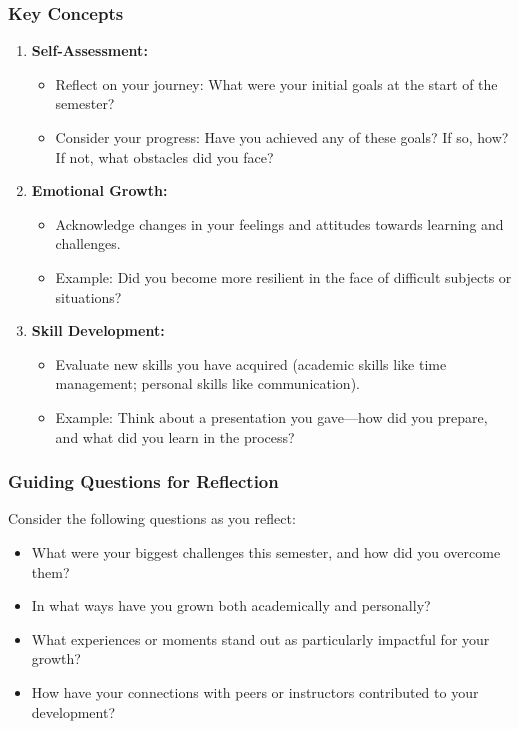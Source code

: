\documentclass[aspectratio=169]{beamer}
\begin{document}
\begin{frame}[fragile]
    \frametitle{Key Concepts}
    \begin{enumerate}
        \item \textbf{Self-Assessment:}
            \begin{itemize}
                \item Reflect on your journey: What were your initial goals at the start of the semester?
                \item Consider your progress: Have you achieved any of these goals? If so, how? If not, what obstacles did you face?
            \end{itemize}
      
        \item \textbf{Emotional Growth:}
            \begin{itemize}
                \item Acknowledge changes in your feelings and attitudes towards learning and challenges.
                \item Example: Did you become more resilient in the face of difficult subjects or situations?
            \end{itemize}

        \item \textbf{Skill Development:}
            \begin{itemize}
                \item Evaluate new skills you have acquired (academic skills like time management; personal skills like communication).
                \item Example: Think about a presentation you gave—how did you prepare, and what did you learn in the process?
            \end{itemize}
    \end{enumerate}
\end{frame}

\begin{frame}[fragile]
    \frametitle{Guiding Questions for Reflection}
    Consider the following questions as you reflect:
    \begin{itemize}
        \item What were your biggest challenges this semester, and how did you overcome them?
        \item In what ways have you grown both academically and personally?
        \item What experiences or moments stand out as particularly impactful for your growth?
        \item How have your connections with peers or instructors contributed to your development?
    \end{itemize}
\end{frame}
\end{document}
